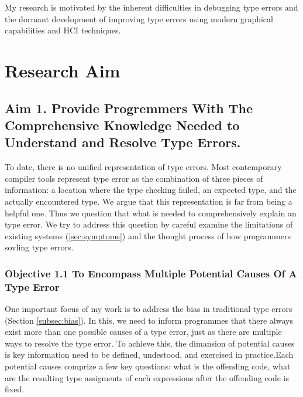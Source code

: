 

My research is motivated by the inherent difficulties in debugging type errors and the dormant development of improving type errors using modern graphical capabilities and HCI techniques.

\section{Research Aim}

\subsection{Aim 1. Provide Progremmers With The Comprehensive Knowledge Needed to Understand and Resolve Type Errors.}

To date, there is no unified representation of type errors. Most contemporary compiler tools represent type error as the combination of three pieces of information: a location where the type checking failed, an expected type, and the actually encountered type. We argue that this representation is far from being a helpful one. Thus we question that what is needed to comprehensively explain an type error. We try to address this question by careful examine the limitations of existing systems (\ref{sec:symptoms}) and the thought process of how programmers sovling type errors.

\subsubsection{Objective 1.1 To Encompass Multiple Potential Causes Of A Type Error}
One important focus of my work is to address the bias in traditional type errors (Section \ref{subsec:bias}). In this, we need to inform programmes that there always exist more than one possible causes of a type error, just as there are multiple ways to resolve the type error. To achieve this, the dimansion of potential causes is key information need to be defined, undestood, and exercised in practice.Each potential causes comprize a few key questions: what is the offending code, what are the resulting type assigments of each expressions after the offending code is fixed.

